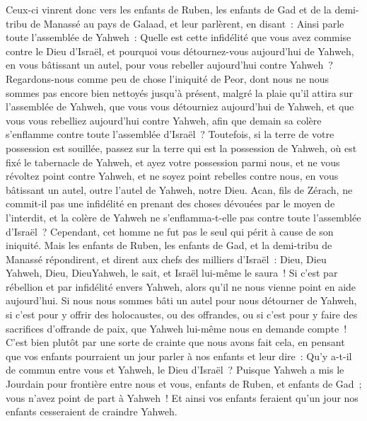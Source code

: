 \begin{multicols}{2}
Ceux-ci vinrent donc vers les enfants de Ruben, les enfants de Gad et de la demi-tribu de Manassé au pays de Galaad, et leur parlèrent, en disant~:
Ainsi parle toute l'assemblée de Yahweh~: Quelle est cette infidélité que vous avez commise contre le Dieu d'Israël, et pourquoi vous détournez-vous aujourd'hui de Yahweh, en vous bâtissant un autel, pour vous rebeller aujourd'hui contre Yahweh~?
Regardons-nous comme peu de chose l'iniquité de Peor, dont nous ne nous sommes pas encore bien nettoyés jusqu'à présent, malgré la plaie qu'il attira sur l'assemblée de Yahweh,
que vous vous détourniez aujourd'hui de Yahweh, et que vous vous rebelliez aujourd'hui contre Yahweh, afin que demain sa colère s'enflamme contre toute l'assemblée d'Israël~?
Toutefois, si la terre de votre possession est souillée, passez sur la terre qui est la possession de Yahweh, où est fixé le tabernacle de Yahweh, et ayez votre possession parmi nous, et ne vous révoltez point contre Yahweh, et ne soyez point rebelles contre nous, en vous bâtissant un autel, outre l'autel de Yahweh, notre Dieu.
Acan, fils de Zérach, ne commit-il pas une infidélité en prenant des choses dévouées par le moyen de l'interdit, et la colère de Yahweh ne s'enflamma-t-elle pas contre toute l'assemblée d'Israël~? Cependant, cet homme ne fut pas le seul qui périt à cause de son iniquité.
Mais les enfants de Ruben, les enfants de Gad, et la demi-tribu de Manassé répondirent, et dirent aux chefs des milliers d'Israël~:
Dieu, Dieu Yahweh, Dieu, DieuYahweh, le sait, et Israël lui-même le saura~! Si c'est par rébellion et par infidélité envers Yahweh, alors qu'il ne nous vienne point en aide aujourd'hui.
Si nous nous sommes bâti un autel pour nous détourner de Yahweh, si c'est pour y offrir des holocaustes, ou des offrandes, ou si c'est pour y faire des sacrifices d'offrande de paix, que Yahweh lui-même nous en demande compte~!
C'est bien plutôt par une sorte de crainte que nous avons fait cela, en pensant que vos enfants pourraient un jour parler à nos enfants et leur dire~: Qu'y a-t-il de commun entre vous et Yahweh, le Dieu d'Israël~?
Puisque Yahweh a mis le Jourdain pour frontière entre nous et vous, enfants de Ruben, et enfants de Gad~; vous n'avez point de part à Yahweh~! Et ainsi vos enfants feraient qu'un jour nos enfants cesseraient de craindre Yahweh.

\end{multicols}
